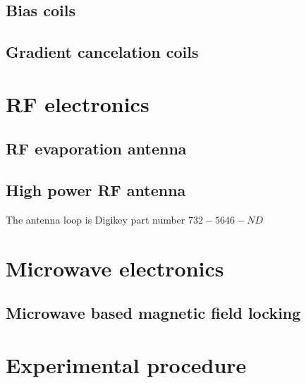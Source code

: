 \subsection{Bias coils}
\subsection{Gradient cancelation coils}

\section{RF electronics}
\subsection{RF evaporation antenna}
\subsection{High power RF antenna}
The antenna loop is Digikey part number $732-5646-ND$

\section{Microwave electronics}

\subsection{Microwave based magnetic field locking}

\section{Experimental procedure}


